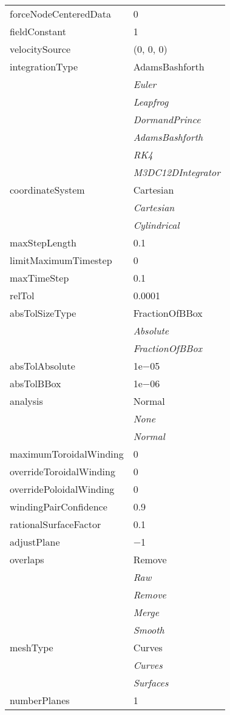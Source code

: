 \documentclass[10pt,a4paper]{report}
\begin{document}
\begin{longtable}{ll}
forceNodeCenteredData  &  0 \\
fieldConstant  &  1 \\
velocitySource  &  (0, 0, 0) \\
integrationType  &  AdamsBashforth   \\
 & {\it  Euler} \\
 & {\it  Leapfrog} \\
 & {\it  DormandPrince} \\
 & {\it  AdamsBashforth} \\
 & {\it  RK4} \\
 & {\it  M3DC12DIntegrator} \\
coordinateSystem  &  Cartesian   \\
 & {\it  Cartesian} \\
 & {\it  Cylindrical} \\
maxStepLength  &  0.1 \\
limitMaximumTimestep  &  0 \\
maxTimeStep  &  0.1 \\
relTol  &  0.0001 \\
absTolSizeType  &  FractionOfBBox   \\
 & {\it  Absolute} \\
 & {\it  FractionOfBBox} \\
absTolAbsolute  &  1e$-$05 \\
absTolBBox  &  1e$-$06 \\
analysis  &  Normal   \\
 & {\it  None} \\
 & {\it  Normal} \\
maximumToroidalWinding  &  0 \\
overrideToroidalWinding  &  0 \\
overridePoloidalWinding  &  0 \\
windingPairConfidence  &  0.9 \\
rationalSurfaceFactor  &  0.1 \\
adjustPlane  &  $-$1 \\
overlaps  &  Remove   \\
 & {\it  Raw} \\
 & {\it  Remove} \\
 & {\it  Merge} \\
 & {\it  Smooth} \\
meshType  &  Curves   \\
 & {\it  Curves} \\
 & {\it  Surfaces} \\
numberPlanes  &  1 \\

\end{longtable}
\end{document}

